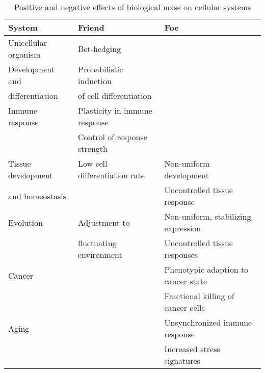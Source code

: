 \begin{table}[hb	]
\centering
\caption{Positive and negative effects of biological noise on cellular systems}
\label{table:effects_noise}
\begin{tabular}{l l l}
\toprule
System & Friend & Foe \\ 
\midrule
Unicellular organism & Bet-hedging & \\
\midrule
Development and & Probabilistic induction  & \\
differentiation & of cell differentiation & \\
\midrule
Immune response & Plasticity in immune response & \\
 & Control of response strength &   \\
\midrule
Tissue development  & Low cell differentiation rate & Non-uniform development \\ 
and homeostasis &  & Uncontrolled tissue response \\
\midrule
Evolution & Adjustment to  & Non-uniform, stabilizing expression \\ 
& fluctuating environment & Uncontrolled tissue responses \\
\midrule
Cancer &  & Phenotypic adaption to cancer state \\
& & Fractional killing of cancer cells \\
\midrule
Aging &  & Unsynchronized immune response \\
& & Increased stress signatures \\ 
\bottomrule
\end{tabular}
\end{table}
